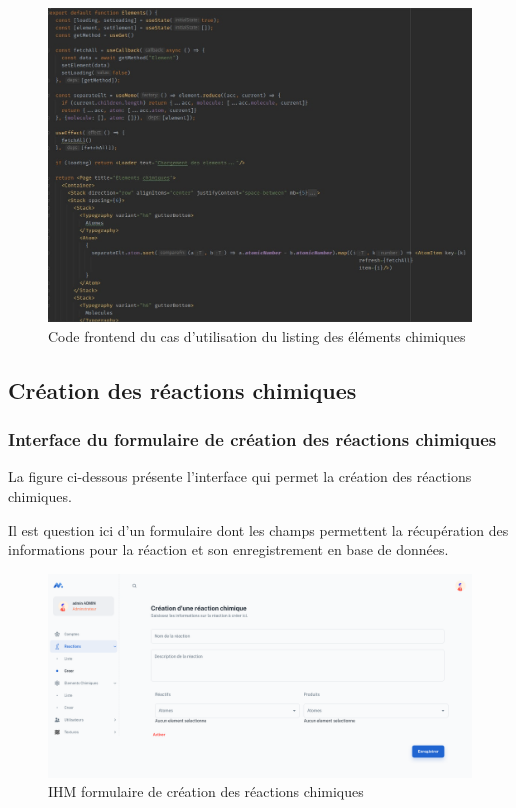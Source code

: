 \begin{figure}[H]
	\centering
	\includegraphics[width=1\textwidth]{img/fetl}
	\caption{Code frontend du cas d'utilisation du listing des éléments chimiques}
\end{figure}

\subsection{Création des réactions chimiques}

\subsubsection{Interface du formulaire de création des réactions chimiques}

La figure ci-dessous présente l'interface qui permet la création des réactions chimiques. 

Il est question ici d'un formulaire dont les champs permettent la récupération des informations pour la réaction et son enregistrement en base de données.

\begin{figure}[H]
	\centering
	\includegraphics[width=1\textwidth]{img/icrc}
	\caption{IHM formulaire de création des réactions chimiques}
\end{figure}

